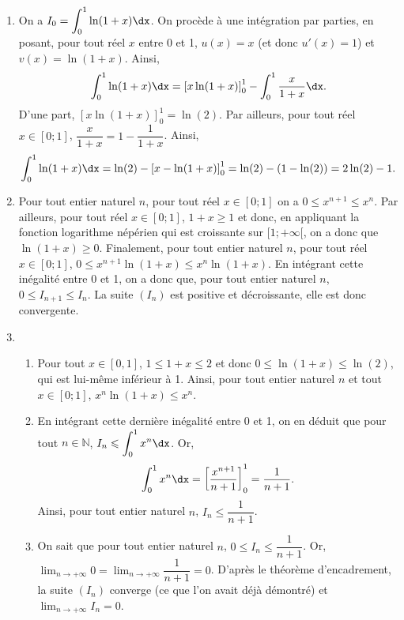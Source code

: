 \documentclass[11pt,fleqn, openany]{book} %
\begin{document}
\begin{solution}\hspace{0pt}

	\begin{enumerate}
\item  On a \(I_0=\displaystyle\int_0^1\ln(1+x)\dx\). On procède à une intégration par parties, en posant, pour tout réel \(x\) entre 0 et 1, \(u(x)=x\) (et donc \(u'(x)=1\)) et \(v(x)=\ln(1+x)\). Ainsi,
\[\displaystyle\int_0^1\ln(1+x)\dx = \left[x\ln(1+x)\right]_0^1-\displaystyle\int_0^1 \dfrac{x}{1+x}\dx.\]
D'une part, \(\left[x\ln(1+x)\right]_0^1=\ln(2)\). Par ailleurs, pour tout réel \(x \in [0;1]\), \(\dfrac{x}{1+x}=1-\dfrac{1}{1+x}\). Ainsi, 
\[\displaystyle\int_0^1\ln(1+x)\dx = \ln (2)- \left[x-\ln(1+x)\right]_0^1 = \ln(2)-(1-\ln(2))=2\ln(2)-1.\]

\item  Pour tout entier naturel \(n\), pour tout réel \(x \in [0;1]\) on a \(0 \leqslant x^{n+1}\leqslant x^n\). Par ailleurs, pour tout réel \(x\in[0;1]\), \(1+x \geqslant 1\) et donc, en appliquant la fonction logarithme népérien qui est croissante sur \([1;+\infty[\), on a donc que \(\ln(1+x)\geqslant 0\).
	Finalement, pour tout entier naturel \(n\), pour tout réel \(x \in [0;1]\), \(0 \leqslant x^{n+1}\ln(1+x) \leqslant x^n\ln(1+x)\). En intégrant cette inégalité entre 0 et 1, on a donc que, pour tout entier naturel \(n\), \(0 \leqslant I_{n+1} \leqslant I_n\). La suite \((I_n)\) est positive et décroissante, elle est donc convergente.
\item  \begin{enumerate}
\item  Pour tout \(x\in [0,1]\), \(1 \leqslant 1+x \leqslant 2\) et donc \(0 \leqslant\ln(1+x)\leqslant \ln(2)\), qui est lui-même inférieur à 1. Ainsi, pour tout entier naturel \(n\) et tout \(x\in [0;1]\), \(x^n \ln(1+x) \leqslant x^n\).
\item  En intégrant cette dernière inégalité entre 0 et 1, on en déduit que pour tout \(n \in \mathbb{N}\), \(I_n \leqslant \displaystyle\int_0^1x^n\dx\). Or, \[\displaystyle\int_0^1 x^n \dx=\left[\dfrac{x^{n+1}}{n+1}\right]_0^1=\dfrac{1}{n+1}.\]
Ainsi, pour tout entier naturel \(n\), \(I_n \leqslant \dfrac{1}{n+1}\).
\item  On sait que pour tout entier naturel \(n\), \(0 \leqslant I_n \leqslant \dfrac{1}{n+1}\). Or, \(\displaystyle\lim_{n \to + \infty}0 = \displaystyle\lim_{n \to + \infty}\dfrac{1}{n+1}=0\). D'après le théorème d'encadrement, la suite \((I_n)\) converge (ce que l'on avait déjà démontré) et \(\displaystyle\lim_{n \to+\infty}I_n=0\).

\end{enumerate}
\end{enumerate}
\end{solution}
\end{document}

